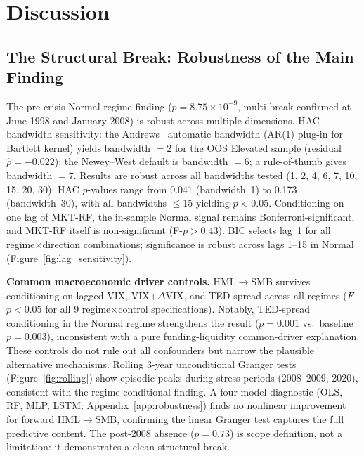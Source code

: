 \documentclass[sigconf,anonymous]{acmart}
\begin{document}
\section{Discussion}

\subsection{The Structural Break: Robustness of the Main Finding}
\label{sec:robustness}
\label{sec:msvar}
\label{sec:trading}
\label{sec:risk_monitoring}
\label{sec:optima_discussion}

The pre-crisis Normal-regime finding ($p = 8.75 \times 10^{-9}$, multi-break
confirmed at June 1998 and January 2008) is robust across multiple dimensions.
HAC bandwidth sensitivity: the Andrews~\cite{andrews1991heteroskedasticity} automatic bandwidth
(AR(1) plug-in for Bartlett kernel) yields bandwidth $= 2$ for the OOS Elevated sample
(residual $\hat{\rho} = -0.022$); the Newey--West default is bandwidth $= 6$;
a rule-of-thumb gives bandwidth $= 7$.
Results are robust across all bandwidths tested (1, 2, 4, 6, 7, 10, 15, 20, 30):
HAC $p$-values range from 0.041 (bandwidth~1) to 0.173 (bandwidth~30),
with all bandwidths $\leq 15$ yielding $p < 0.05$.
Conditioning on one lag of MKT-RF, the in-sample Normal signal remains
Bonferroni-significant, and MKT-RF itself is non-significant (F-$p > 0.43$).
BIC selects lag~1 for all regime$\times$direction combinations; significance
is robust across lags 1--15 in Normal (Figure~\ref{fig:lag_sensitivity}).

\textbf{Common macroeconomic driver controls.}
HML$\to$SMB survives conditioning on lagged VIX, VIX$+\Delta$VIX, and TED spread
across all regimes ($F$-$p < 0.05$ for all 9 regime$\times$control specifications).
Notably, TED-spread conditioning in the Normal regime strengthens the result
($p = 0.001$ vs.\ baseline $p = 0.003$), inconsistent with a pure funding-liquidity
common-driver explanation. These controls do not rule out all confounders but
narrow the plausible alternative mechanisms.
Rolling 3-year unconditional Granger tests (Figure~\ref{fig:rolling}) show
episodic peaks during stress periods (2008--2009, 2020), consistent with
the regime-conditional finding. A four-model diagnostic (OLS, RF, MLP, LSTM;
Appendix~\ref{app:robustness}) finds no nonlinear improvement for forward
HML$\to$SMB, confirming the linear Granger test captures the full predictive
content. The post-2008 absence ($p = 0.73$) is scope definition, not a
limitation: it demonstrates a clean structural break.
\end{document}
